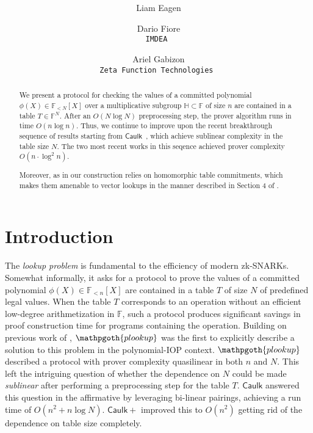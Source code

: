 \documentclass[11pt]{article} %
\title{ \bf \papertitle \\[0.72cm]}
\author{ Liam Eagen \and  Dario Fiore \\ \tt{IMDEA}  \and Ariel Gabizon \\ \tt{Zeta Function Technologies} }
\newcommand{\caulkp}{\ensuremath{\mathsf{\mathrel{Caulk}\mathrel{\scriptstyle{+}}}}\xspace}
\newcommand{\caulk}{\ensuremath{\mathsf{Caulk}}\xspace}
\newcommand{\plookup}{\ensuremath{\mathpgoth{plookup}}\xspace}
\newcommand{\F}{\ensuremath{\mathbb F}\xspace}
\newcommand{\polysofdeg}[1]{\ensuremath{\F_{< #1}[X]}\xspace}
\newcommand{\subspace}{\ensuremath{\mathbb{H}}\xspace}
\newcommand{\witsize}{\ensuremath{n}\xspace}
\newcommand{\tabsize}{\ensuremath{N}\xspace}
\begin{document}
    \maketitle
\begin{abstract}
 We present a protocol for checking the values of a committed polynomial $\phi(X)\in \polysofdeg{\tabsize}$ over a multiplicative subgroup $\subspace\subset \F$ of size \witsize are contained in a
 table $T\in \F^\tabsize$. After an $O(\tabsize \log \tabsize)$ preprocessing step, the prover algorithm runs in time $O(\witsize\log \witsize)$. Thus, we continue to improve upon the recent breakthrough sequence of results\cite{caulk,caulkp,flookup,baloo} starting from \caulk~\cite{caulk}, which achieve sublinear complexity in the table size \tabsize. The two most recent works in this seqence \cite{flookup,baloo} achieved
 prover complexity $O(\witsize\cdot \log^2 \witsize)$.
 
 Moreover, as in \cite{caulk,caulkp,baloo} our construction relies on homomorphic table commitments, which makes them amenable to vector lookups in the manner described in Section 4 of \cite{plookup}.
 \end{abstract}


\section{Introduction}
The \emph{lookup problem} is fundamental to the efficiency of modern zk-SNARKs.
Somewhat informally, it asks for a protocol to prove the values of a committed polynomial $\phi(X)\in\polysofdeg{\witsize}$ are contained in a table $T$ of size $\tabsize$ of predefined legal values.
When the table $T$ corresponds to an operation without an efficient low-degree arithmetization in $\F$, such a protocol produces significant savings in proof construction time for programs containing the operation.
Building on previous work of \cite{arya}, \plookup \cite{plookup} was the first to explicitly describe a solution to this problem in the polynomial-IOP context. \plookup described a protocol with prover complexity quasilinear in both \witsize and \tabsize.
This left the intriguing question of whether the dependence on \tabsize could be made \emph{sublinear} after performing a preprocessing step for the table $T$.
\caulk \cite{caulk} answered this question in the affirmative by leveraging bi-linear pairings, achieving a run time of $O(\witsize^2+\witsize\log \tabsize)$. \caulkp \cite{caulkp} improved this to $O(\witsize^2)$ getting rid of the dependence on table size completely. 
\end{document}
